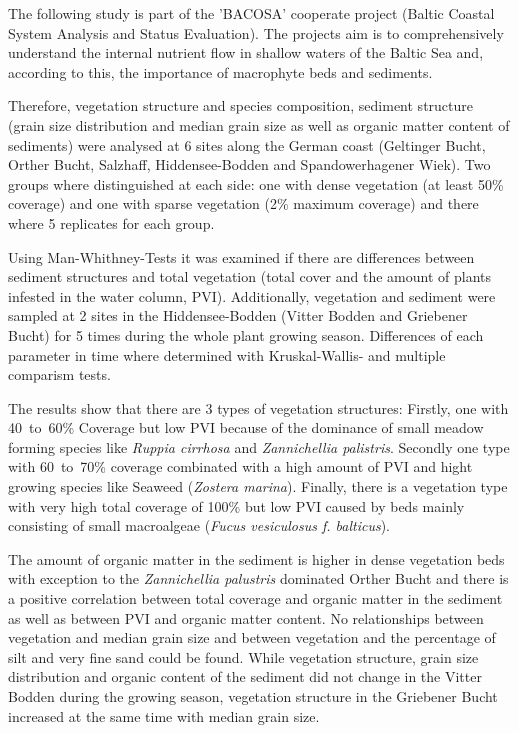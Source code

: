  The following study is part of the 'BACOSA' cooperate project (Baltic Coastal System Analysis and Status Evaluation). The projects aim is to comprehensively understand the internal nutrient flow in shallow waters of the Baltic Sea and, according to this, the importance of macrophyte beds and sediments. 
 
 Therefore, vegetation structure and species composition, sediment structure (grain size distribution and median grain size as well as organic matter content of sediments) were analysed at 6 sites along the German coast (Geltinger Bucht, Orther Bucht, Salzhaff, Hiddensee-Bodden and Spandowerhagener Wiek). Two groups where distinguished at each side: one with dense vegetation (at least \unit{50}{\%} coverage) and one with sparse vegetation (\unit{2}{\%} maximum coverage) and there where 5 replicates for each group. 
 
Using Man-Whithney-Tests it was examined if there are differences between sediment structures and total vegetation (total cover and the amount of plants infested in the water column, PVI). Additionally, vegetation and sediment were sampled at 2 sites in the Hiddensee-Bodden (Vitter Bodden and Griebener Bucht) for 5 times during the whole plant growing season. Differences of each parameter in time where determined with Kruskal-Wallis- and multiple comparism tests. 

The results show that there are 3 types of vegetation structures: Firstly, one with \unit{40 to 60}{\%} Coverage but low PVI because of the dominance of small meadow forming species like \textit{Ruppia cirrhosa} and \textit{Zannichellia palistris}. Secondly one type with \unit{60 to 70}{\%} coverage combinated with a high amount of PVI and hight growing species like Seaweed (\textit{Zostera marina}). Finally, there is a vegetation type with very high total coverage of \unit{100}{\%} but low PVI caused by beds mainly consisting of small macroalgeae (\textit{Fucus vesiculosus f. balticus}). 

The amount of organic matter in the sediment is higher in dense vegetation beds with exception to the \textit{Zannichellia palustris} dominated Orther Bucht and there is a positive correlation between total coverage and organic matter in the sediment as well as between PVI and organic matter content. 
No relationships between vegetation and median grain size and between vegetation and the percentage of silt and very fine sand could be found. While vegetation structure, grain size distribution and organic content of the sediment did not change in the Vitter Bodden during the growing season, vegetation structure in the Griebener Bucht increased at the same time with median grain size.







